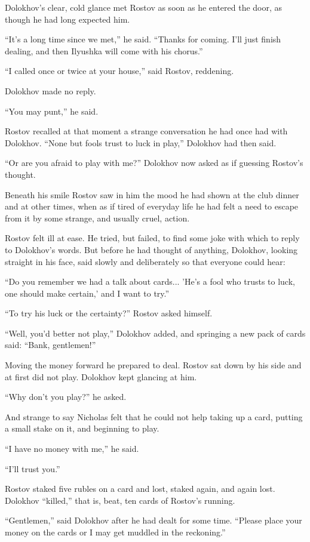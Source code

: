 Dolokhov's clear, cold glance met Rostov as soon as he entered
the door, as though he had long expected him.

``It's a long time since we met,'' he said. ``Thanks for
coming. I'll just finish dealing, and then Ilyushka will come
with his chorus.''

``I called once or twice at your house,'' said Rostov, reddening.

Dolokhov made no reply.

``You may punt,'' he said.

Rostov recalled at that moment a strange conversation he had once
had with Dolokhov. ``None but fools trust to luck in play,''
Dolokhov had then said.

``Or are you afraid to play with me?'' Dolokhov now asked as if
guessing Rostov's thought.

Beneath his smile Rostov saw in him the mood he had shown at the
club dinner and at other times, when as if tired of everyday life
he had felt a need to escape from it by some strange, and usually
cruel, action.

Rostov felt ill at ease. He tried, but failed, to find some joke
with which to reply to Dolokhov's words. But before he had
thought of anything, Dolokhov, looking straight in his face, said
slowly and deliberately so that everyone could hear:

``Do you remember we had a talk about cards... 'He's a fool who
trusts to luck, one should make certain,' and I want to try.''

``To try his luck or the certainty?'' Rostov asked himself.

``Well, you'd better not play,'' Dolokhov added, and springing a
new pack of cards said: ``Bank, gentlemen!''

Moving the money forward he prepared to deal. Rostov sat down by
his side and at first did not play. Dolokhov kept glancing at
him.

``Why don't you play?'' he asked.

And strange to say Nicholas felt that he could not help taking up
a card, putting a small stake on it, and beginning to play.

``I have no money with me,'' he said.

``I'll trust you.''

Rostov staked five rubles on a card and lost, staked again, and
again lost. Dolokhov ``killed,'' that is, beat, ten cards of
Rostov's running.

``Gentlemen,'' said Dolokhov after he had dealt for some
time. ``Please place your money on the cards or I may get muddled
in the reckoning.''

